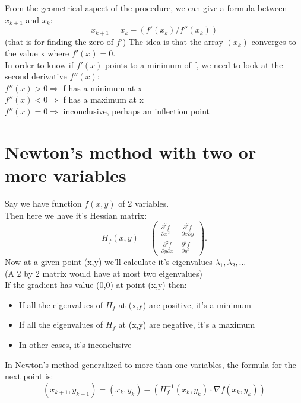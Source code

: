 \documentclass[12pt, letterpaper]{article}
\begin{document}
From the geometrical aspect of the procedure, we can give a formula between $x_{k+1}$ and $x_k$:
\[
x_{k+1} = x_k - (f'(x_k) / f''(x_k))
\]
(that is for finding the zero of $f'$)
The idea is that the array $(x_k)$ converges to the value x where $f'(x) = 0$.\\

In order to know if $f'(x)$ points to a minimum of f, we need to look at the second derivative $f''(x)$:\\
$f''(x) > 0 \Rightarrow$ f has a minimum at x\\
$f''(x) < 0 \Rightarrow$ f has a maximum at x\\
$f''(x) = 0 \Rightarrow$ inconclusive, perhaps an inflection point\\


\section{Newton's method with two or more variables}
Say we have function $f(x,y)$ of 2 variables.\\

Then here we have it's Hessian matrix:
\[
H_f(x,y) =
\begin{pmatrix}
\frac{\partial^2 f}{\partial x^2} & \frac{\partial^2 f}{\partial x \partial y} \\[1em]
\frac{\partial^2 f}{\partial y \partial x} & \frac{\partial^2 f}{\partial y^2}
\end{pmatrix}.
\]
Now at a given point (x,y) we'll calculate it's eigenvalues $\lambda_1, \lambda_2, \ldots$\\
(A 2 by 2 matrix would have at most two eigenvalues)\\

If the gradient has value (0,0) at point (x,y) then:
\begin{itemize}
    \item If all the eigenvalues of $H_f$ at (x,y) are positive, it's a minimum
    \item If all the eigenvalues of $H_f$ at (x,y) are negative, it's a maximum
    \item In other cases, it's inconclusive
\end{itemize}

In Newton's method generalized to more than one variables, the formula for the next point is:\\
\[
(x_{k+1},y_{k+1}) = (x_k,y_k) - ( H_f^{-1}(x_k,y_k) \cdot \nabla f(x_k,y_k) )
\]
\end{document}
